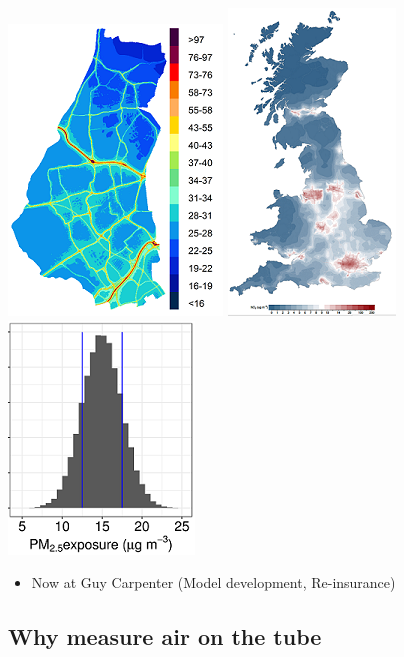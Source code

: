 \documentclass[]{article}
\providecommand{\tightlist}{%
  \setlength{\itemsep}{0pt}\setlength{\parskip}{0pt}}
\begin{document}
\includegraphics{images/no2_2020_raster.png}
\includegraphics{images/cmaq_uk_v2.png}
\includegraphics{images/theoretical_lhem_pm25.png}

\begin{itemize}
\tightlist
\item
  Now at Guy Carpenter (Model development, Re-insurance)
\end{itemize}

\hypertarget{why-measure-air-on-the-tube}{%
\subsection{Why measure air on the
tube}\label{why-measure-air-on-the-tube}}
\end{document}
